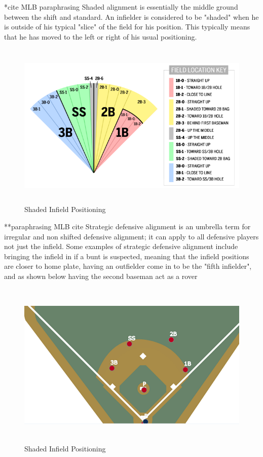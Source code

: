 \documentclass{article}
\begin{document}
*cite MLB paraphrasing
Shaded alignment is essentially the middle ground between the shift and standard. An infielder is considered to be "shaded" when he is outside of his typical "slice" of the field for his position. This typically means that he has moved to the left or right of his usual positioning. 
\vspace{1.5cm}
\begin{figure}[h]
    \centering        
    \includegraphics[height=8cm]{images/shaded.png}
    \caption{Shaded Infield Positioning}
\end{figure}
\vspace{1.5cm}

\newpage
**paraphrasing MLB cite 
Strategic defensive alignment is an umbrella term for irregular and non shifted defensive alignment; it can apply to all defensive players not just the infield. Some examples of strategic defensive alignment include bringing the infield in if a bunt is suspected, meaning that the infield positions are closer to home plate, having an outfielder come in to be the "fifth infielder", and as shown below having the second baseman act as a rover
\vspace{1.5cm}
\begin{figure}[h]
    \centering        
    \includegraphics[height=8cm]{images/strategic.png}
    \caption{Shaded Infield Positioning}
\end{figure}
\vspace{1.5cm}
\end{document}
